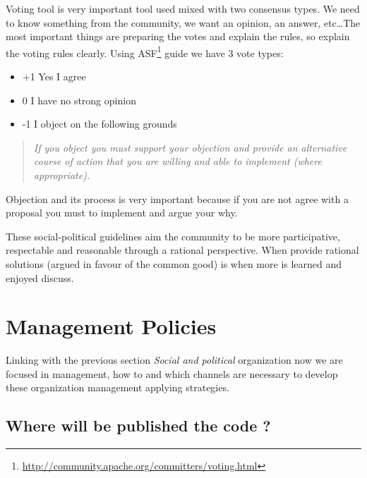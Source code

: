 \documentclass[11pt]{scrartcl}
\begin{document}
\par Voting tool is very important tool used mixed with two consensus types. We need to know something from the community, we want an opinion, an answer, etc\ldots The most important things are preparing the votes and explain the rules, so explain the voting rules clearly. Using ASF\footnote{\url{http://community.apache.org/committers/voting.html}} guide we have 3 vote types:

\begin{itemize}
	\item +1 Yes I agree
	\item 0 I have no strong opinion
	\item -1 I object on the following grounds
\end{itemize}

\begin{quote}
    \emph{If you object you must support your objection and provide an alternative course of action that you are willing and able to implement (where appropriate).}
\end{quote}

\par Objection and its process is very important because if you are not agree with a proposal you must to implement and argue your why.

\par These social-political guidelines aim the community to be more participative, respectable and reasonable through a rational perspective. When provide rational solutions (argued in favour of the common good) is when more is learned and enjoyed discuss.


\section{Management Policies}
\label{sec:management-policies}

\par Linking with the previous section \emph{Social and political} organization now we are focused in management, how to and which channels are necessary to develop these organization management applying strategies.

\subsection{Where will be published the code ?}
\label{sub:publish-code}
\end{document}
